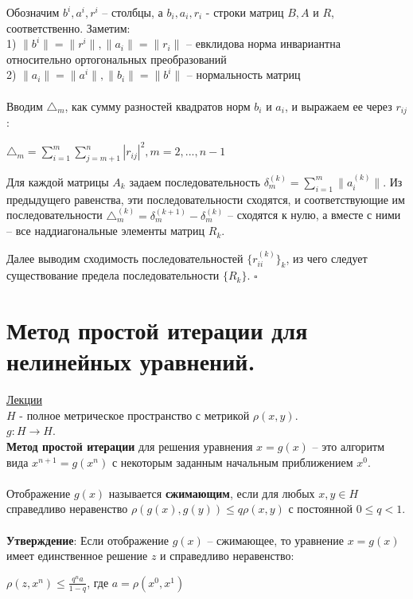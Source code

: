 \documentclass[specialist, subf, href, colorlinks=true, 12pt, times, mtpro, final]{disser}
\theoremstyle{definition}
\begin{document}
Обозначим $b^i, a^i, r^i$ \--- столбцы, а $b_i, a_i, r_i$ - строки матриц $B, A$ и $R$, соответственно. 
Заметим:\\
1) $\|b^i\| = \|r^i\|, \|a_i\| = \|r_i\|$ \--- евклидова норма инвариантна относительно ортогональных преобразований\\
2) $\|a_i\| = \|a^i\|, \|b_i\| = \|b^i\|$ \--- нормальность матриц\\
\\
Вводим $\triangle_m$, как сумму разностей квадратов норм $b_i$ и $a_i$, и выражаем ее через $r_{ij}$:
\begin{center}
$\triangle_m = \sum\limits^m_{i=1} \sum\limits^n_{j=m+1} |r_{ij}|^2, m =2, ... , n-1$
\end{center}

Для каждой матрицы $A_k$ задаем последовательность $\delta^{(k)}_m = \sum\limits^m_{i=1} \|a^{(k)}_i\|$. Из предыдущего равенства, эти последовательности сходятся, и соответствующие им последовательности $\triangle^{(k)}_m = \delta^{(k+1)}_m - \delta^{(k)}_m$ \--- сходятся к нулю, а вместе с ними \--- все наддиагональные элементы матриц $R_k$.

Далее выводим сходимость последовательностей $\{r^{(k)}_{ii}\}_k$, из чего следует существование предела последовательности $\{R_k\}$. $\square$



\section {Метод простой итерации для нелинейных уравнений.}
	\hyperlink {lects.82}{Лекции}\\
	
$H$	 - полное метрическое пространство с метрикой $\rho(x,y)$.\\
$g:H \rightarrow H$.\\

\textbf{Метод простой итерации} для решения уравнения $x = g(x)$ \--- это алгоритм вида $x^{n+1} = g(x^n)$ с некоторым заданным начальным приближением $x^0$.\\
\\
Отображение $g(x)$ называется \textbf{сжимающим}, если для любых $x, y \in H$ справедливо неравенство $\rho(g(x), g(y)) \leq q\rho(x,y)$ с постоянной $0 \leq q < 1$.\\
\\
\textbf{Утверждение}: Если отображение $g(x)$ \--- сжимающее, то уравнение $x=g(x)$  имеет единственное решение $z$ и справедливо неравенство:
\begin{center}
$\rho (z, x^n) \leq \frac{q^na}{1-q}$, где $a = \rho (x^0, x^1)$
\end{center}
\end{document}
